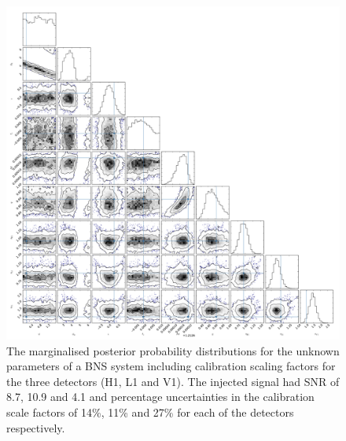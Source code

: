 \documentclass[10pt]{iopart}
\begin{document}
\begin{figure}
 \begin{center}
  \includegraphics[width=1.0\textwidth]{bns_post_fig.pdf}
 \end{center}
 \caption{\label{fig:bnspost} The marginalised posterior probability distributions for the unknown
 parameters of a \ac{BNS} system including calibration scaling factors for the three detectors (H1, 
L1 and V1). The injected signal had \ac{SNR} of 8.7, 10.9 and 4.1 and percentage uncertainties in 
the calibration scale factors of 14\%, 11\% and 27\% for each of the detectors respectively.}
\end{figure}
\end{document}
